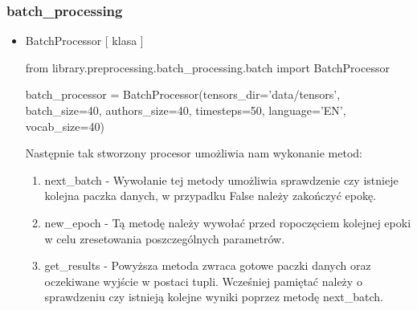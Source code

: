 \subsubsection{batch\_processing}

\myspace
{}
\myspace

\begin{itemize}

\item {BatchProcessor [ klasa ] }
\begin{import}
from library.preprocessing.batch_processing.batch import BatchProcessor

batch_processor = BatchProcessor(tensors_dir='data/tensors',
                                             batch_size=40,
                                             authors_size=40,
                                             timesteps=50,
                                             language='EN',
                                             vocab_size=40)
\end{import}

Następnie tak stworzony procesor umożliwia nam wykonanie metod:

\begin{enumerate}
	\item {next\_batch } - 
	Wywołanie tej metody umożliwia sprawdzenie czy istnieje kolejna paczka danych, w przypadku False
	należy zakończyć epokę.
	
	\item {new\_epoch } - 
	Tą metodę należy wywołać przed ropoczęciem kolejnej epoki w celu zresetowania poszczególnych 
	parametrów.
	
	\item { get\_results } - 
	Powyższa metoda zwraca gotowe paczki danych oraz oczekiwane wyjście w postaci tupli. 
	Wcześniej pamiętać należy o sprawdzeniu czy istnieją kolejne wyniki poprzez metodę next\_batch.
\end{enumerate}

\end{itemize}